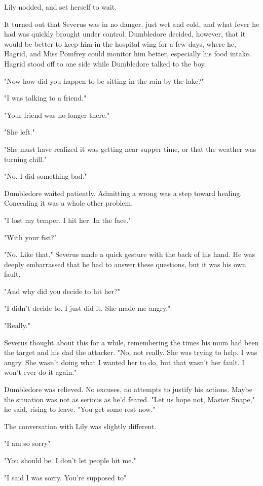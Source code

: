 Lily nodded, and set herself to wait.

It turned out that Severus was in no danger, just wet and cold, and what fever he had was quickly brought under control. Dumbledore decided, however, that it would be better to keep him in the hospital wing for a few days, where he, Hagrid, and Miss Pomfrey could monitor him better, especially his food intake. Hagrid stood off to one side while Dumbledore talked to the boy.

"Now how did you happen to be sitting in the rain by the lake?"

"I was talking to a friend."

"Your friend was no longer there."

"She left."

"She must have realized it was getting near supper time, or that the weather was turning chill."

"No. I did{\el} something bad."

Dumbledore waited patiently. Admitting a wrong was a step toward healing. Concealing it was a whole other problem.

"I{\el} lost my temper. I hit her. In the face."

"With your fist?"

"No. Like that." Severus made a quick gesture with the back of his hand. He was deeply embarrassed that he had to answer these questions, but it was his own fault.

"And why did you decide to hit her?"

"I didn't decide to. I just did it. She made me angry."

"Really."

Severus thought about this for a while, remembering the times his mum had been the target and his dad the attacker. "No, not really. She was trying to help. I was angry. She wasn't doing what I wanted her to do, but that wasn't her fault. I won't ever do it again."

Dumbledore was relieved. No excuses, no attempts to justify his actions. Maybe the situation was not as serious as he'd feared. "Let us hope not, Master Snape," he said, rising to leave. "You get some rest now."

The conversation with Lily was slightly different.

"I am so sorry{\el}"

"You should be. I don't let people hit me."

"I said I was sorry. You're supposed to{\el}"

